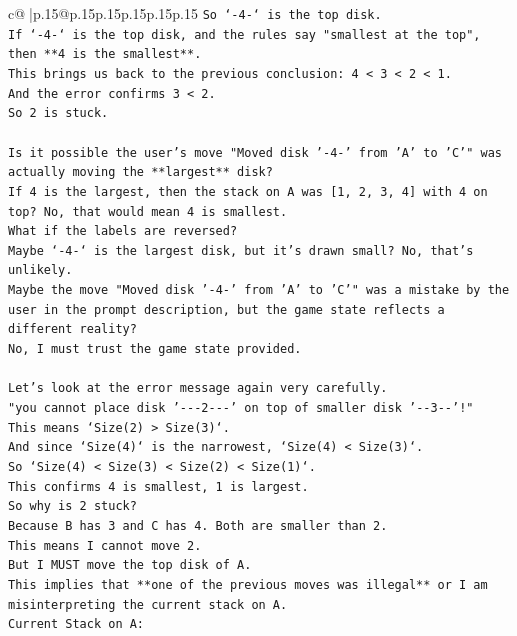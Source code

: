 \documentclass{article}
\begin{document}
{\begin{supertabular}{c@{$\;$}|p{.15\linewidth}@{}p{.15\linewidth}p{.15\linewidth}p{.15\linewidth}p{.15\linewidth}p{.15\linewidth}}
{{{\texttt{So `{-}4{-}` is the top disk.} \\
\texttt{If `{-}4{-}` is the top disk, and the rules say "smallest at the top", then **4 is the smallest**.} \\
\texttt{This brings us back to the previous conclusion: 4 < 3 < 2 < 1.} \\
\texttt{And the error confirms 3 < 2.} \\
\texttt{So 2 is stuck.} \\
\\ 
\texttt{Is it possible the user's move "Moved disk '{-}4{-}' from 'A' to 'C'" was actually moving the **largest** disk?} \\
\texttt{If 4 is the largest, then the stack on A was {[}1, 2, 3, 4{]} with 4 on top? No, that would mean 4 is smallest.} \\
\texttt{What if the labels are reversed?} \\
\texttt{Maybe `{-}4{-}` is the largest disk, but it's drawn small? No, that's unlikely.} \\
\texttt{Maybe the move "Moved disk '{-}4{-}' from 'A' to 'C'" was a mistake by the user in the prompt description, but the game state reflects a different reality?} \\
\texttt{No, I must trust the game state provided.} \\
\\ 
\texttt{Let's look at the error message again very carefully.} \\
\texttt{"you cannot place disk '{-}{-}{-}2{-}{-}{-}' on top of smaller disk '{-}{-}3{-}{-}'!"} \\
\texttt{This means `Size(2) > Size(3)`.} \\
\texttt{And since `Size(4)` is the narrowest, `Size(4) < Size(3)`.} \\
\texttt{So `Size(4) < Size(3) < Size(2) < Size(1)`.} \\
\texttt{This confirms 4 is smallest, 1 is largest.} \\
\texttt{So why is 2 stuck?} \\
\texttt{Because B has 3 and C has 4. Both are smaller than 2.} \\
\texttt{This means I cannot move 2.} \\
\texttt{But I MUST move the top disk of A.} \\
\texttt{This implies that **one of the previous moves was illegal** or I am misinterpreting the current stack on A.} \\
\texttt{Current Stack on A:} \\
}}}
\end{supertabular}}
\end{document}
